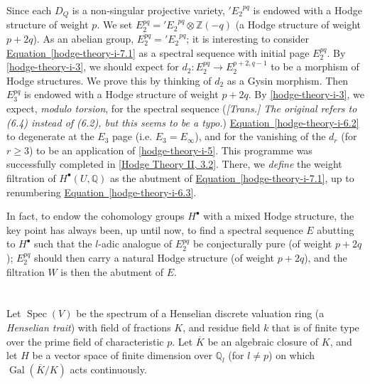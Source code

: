   
  Since each \(D_Q\) is a non-singular projective variety, \({'E_2}^{pq}\) is endowed with a Hodge structure of weight \(p\).
  We set \(E_2^{pq}={'E_2}^{pq}\otimes \mathbb {Z}(-q)\) (a Hodge structure of weight \(p+2q\)).
  As an abelian group, \(E_2^{pq}={'E_2}^{pq}\);
  it is interesting to consider \hyperref[hodge-theory-i-7.1]{Equation~\ref*{hodge-theory-i-7.1}} as a spectral sequence with initial page \(E_2^{pq}\).
  By \cref{hodge-theory-i-3}, we should expect for \(d_2\colon  E_2^{pq}\to  E_2^{p+2,q-1}\) to be a morphism of Hodge structures.
  We prove this by thinking of \(d_2\) as a Gysin morphism.
  Then \(E_3^{pq}\) is endowed with a Hodge structure of weight \(p+2q\).
  By \cref{hodge-theory-i-3}, we expect, \emph{modulo torsion}, for the spectral sequence (\emph{[Trans.] The original refers to (6.4) instead of (6.2), but this seems to be a typo.}) \hyperref[hodge-theory-i-6.2]{Equation~\ref*{hodge-theory-i-6.2}} to degenerate at the \(E_3\) page (i.e. \(E_3=E_\infty \)), and for the vanishing of the \(d_r\) (for \(r\geq 3\)) to be an application of \cref{hodge-theory-i-5}.
  This programme was successfully completed in \hyperref[hodge-theory-ii-3.2]{[Hodge Theory II, 3.2]}.
  There, we \emph{define} the weight filtration of \(H^\bullet (U,\mathbb {Q})\) as the abutment of \hyperref[hodge-theory-i-7.1]{Equation~\ref*{hodge-theory-i-7.1}}, up to renumbering \hyperref[hodge-theory-i-6.3]{Equation~\ref*{hodge-theory-i-6.3}}.\par{}In fact, to endow the cohomology groups \(H^\bullet \) with a mixed Hodge structure, the key point has always been, up until now, to find a spectral sequence \(E\) abutting to \(H^\bullet \) such that the \(l\)-adic analogue of \(E_2^{pq}\) be conjecturally pure (of weight \(p+2q\));
  \(E_2^{pq}\) should then carry a natural Hodge structure (of weight \(p+2q\)), and the filtration \(W\) is then the abutment of \(E\).\chapter{}\thispagestyle{fancy}\label{hodge-theory-i-8}\par{}Let \(\operatorname {Spec}(V)\) be the spectrum of a Henselian discrete valuation ring (a \emph{Henselian trait}) with field of fractions \(K\), and residue field \(k\) that is of finite type over the prime field of characteristic \(p\).
  Let \(\overline {K}\) be an algebraic closure of \(K\), and let \(H\) be a vector space of finite dimension over \(\mathbb {Q}_l\) (for \(l\neq  p\)) on which \(\operatorname {Gal}(\overline {K}/K)\) acts continuously.
